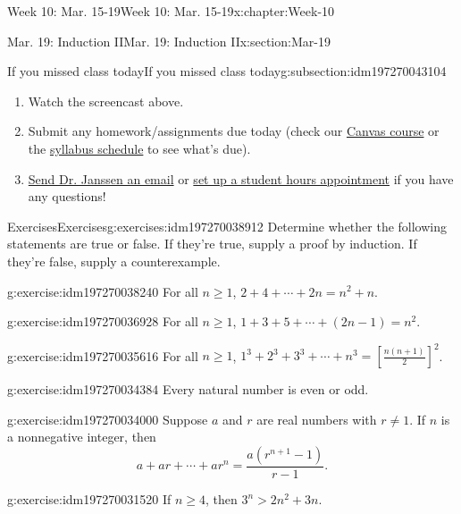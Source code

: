 \documentclass[oneside,10pt,]{book}
\numberwithin{equation}{section}
\renewcommand{\ge}{\geqslant}
\newcommand{\gt}{>}
\begin{document}
\begin{chapterptx}{Week 10: Mar. 15-19}{}{Week 10: Mar. 15-19}{}{}{x:chapter:Week-10}
\begin{sectionptx}{Mar. 19: Induction II}{}{Mar. 19: Induction II}{}{}{x:section:Mar-19}
\begin{subsectionptx}{If you missed class today}{}{If you missed class today}{}{}{g:subsection:idm197270043104}
\begin{enumerate}
\item{}Watch the screencast above.%
\item{}Submit any homework\slash{}assignments due today (check our \href{https://dordt.instructure.com/courses/3110050}{Canvas course} or the \href{https://prof.mkjanssen.org/ds/index.html\#schedule}{syllabus schedule} to see what's due).%
\item{}\href{mailto:mike.janssen@dordt.edu}{Send Dr. Janssen an email} or \href{https://calendly.com/mkjanssen/student-hours}{set up a student hours appointment} if you have any questions!%
\end{enumerate}
\end{subsectionptx}
%
%
\typeout{************************************************}
\typeout{************************************************}
%
\begin{exercises-subsection}{Exercises}{}{Exercises}{}{}{g:exercises:idm197270038912}
Determine whether the following statements are true or false. If they're true, supply a proof by induction. If they're false, supply a counterexample.%
\begin{divisionexercise}{1}{}{}{g:exercise:idm197270038240}%
For all \(n\ge 1\), \(2 + 4 + \cdots + 2n = n^2 + n\).%
\end{divisionexercise}%
\begin{divisionexercise}{2}{}{}{g:exercise:idm197270036928}%
For all \(n\ge 1\), \(1+3+5+\cdots+(2n-1) = n^2\).%
\end{divisionexercise}%
\begin{divisionexercise}{3}{}{}{g:exercise:idm197270035616}%
For all \(n\ge 1\), \(1^3 + 2^3 + 3^3 + \cdots + n^3 = \left[\frac{n(n+1)}{2}\right]^2\).%
\end{divisionexercise}%
\begin{divisionexercise}{4}{}{}{g:exercise:idm197270034384}%
Every natural number is even or odd.%
\end{divisionexercise}%
\begin{divisionexercise}{5}{}{}{g:exercise:idm197270034000}%
Suppose \(a\) and \(r\) are real numbers with \(r\ne 1\). If \(n\) is a nonnegative integer, then%
\begin{equation*}
a + ar + \cdots + ar^n = \frac{a(r^{n+1}-1)}{r-1}.
\end{equation*}
%
\end{divisionexercise}%
\begin{divisionexercise}{6}{}{}{g:exercise:idm197270031520}%
If \(n\ge 4\), then \(3^n \gt 2n^2 + 3n\).%
\end{divisionexercise}%
\end{exercises-subsection}
\end{sectionptx}
\end{chapterptx}
\end{document}
